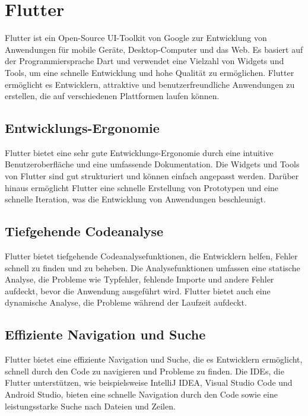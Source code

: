 \section{Flutter}

Flutter ist ein Open-Source UI-Toolkit von Google zur Entwicklung von Anwendungen für mobile Geräte, Desktop-Computer und das Web. Es basiert auf der Programmiersprache Dart und verwendet eine Vielzahl von Widgets und Tools, um eine schnelle Entwicklung und hohe Qualität zu ermöglichen. Flutter ermöglicht es Entwicklern, attraktive und benutzerfreundliche Anwendungen zu erstellen, die auf verschiedenen Plattformen laufen können.

\subsection{Entwicklungs-Ergonomie}

Flutter bietet eine sehr gute Entwicklungs-Ergonomie durch eine intuitive Benutzeroberfläche und eine umfassende Dokumentation. Die Widgets und Tools von Flutter sind gut strukturiert und können einfach angepasst werden. Darüber hinaus ermöglicht Flutter eine schnelle Erstellung von Prototypen und eine schnelle Iteration, was die Entwicklung von Anwendungen beschleunigt.

\subsection{Tiefgehende Codeanalyse}

Flutter bietet tiefgehende Codeanalysefunktionen, die Entwicklern helfen, Fehler schnell zu finden und zu beheben. Die Analysefunktionen umfassen eine statische Analyse, die Probleme wie Typfehler, fehlende Importe und andere Fehler aufdeckt, bevor die Anwendung ausgeführt wird. Flutter bietet auch eine dynamische Analyse, die Probleme während der Laufzeit aufdeckt.
\newpage

\subsection{Effiziente Navigation und Suche}

Flutter bietet eine effiziente Navigation und Suche, die es Entwicklern ermöglicht, schnell durch den Code zu navigieren und Probleme zu finden. Die IDEs, die Flutter unterstützen, wie beispielsweise IntelliJ IDEA, Visual Studio Code und Android Studio, bieten eine schnelle Navigation durch den Code sowie eine leistungsstarke Suche nach Dateien und Zeilen.

